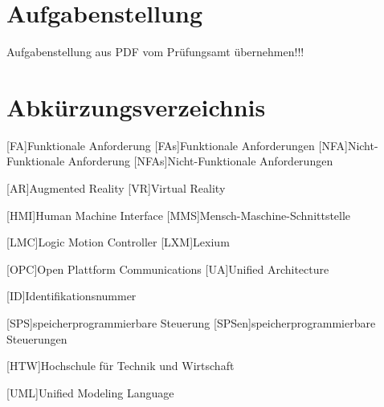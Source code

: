 \documentclass[12pt, a4paper, twoside]{article} %
\begin{document}
\section*{Aufgabenstellung}
\color{red}
Aufgabenstellung aus PDF vom Prüfungsamt übernehmen!!!
\color{black}
\clearpage

\listoffigures
\clearpage

\listoftables
\clearpage

\section*{Abkürzungsverzeichnis}
\begin{acronym}[FA]
	[FA]{Funktionale Anforderung}
	[FAs]{Funktionale Anforderungen}
	[NFA]{Nicht-Funktionale Anforderung}
	[NFAs]{Nicht-Funktionale Anforderungen}
\end{acronym}
\begin{acronym}[VR]
	[AR]{Augmented Reality}
	[VR]{Virtual Reality}
\end{acronym}
\begin{acronym}[HMI]
	[HMI]{Human Machine Interface}
	[MMS]{Mensch-Maschine-Schnittstelle}
\end{acronym}
\begin{acronym}[LMC]
	[LMC]{Logic Motion Controller}
	[LXM]{Lexium}
\end{acronym}
\begin{acronym}[OPC]
	[OPC]{Open Plattform Communications}
	[UA]{Unified Architecture}
\end{acronym}
\begin{acronym}[ID]
	[ID]{Identifikationsnummer}
\end{acronym}
\begin{acronym}[SPS]
	[SPS]{speicherprogrammierbare Steuerung}
	[SPSen]{speicherprogrammierbare Steuerungen}
\end{acronym}
\begin{acronym}[HTW]
	[HTW]{Hochschule für Technik und Wirtschaft}
\end{acronym}
\begin{acronym}[UML]
	[UML]{Unified Modeling Language}
\end{acronym}
\end{document}
